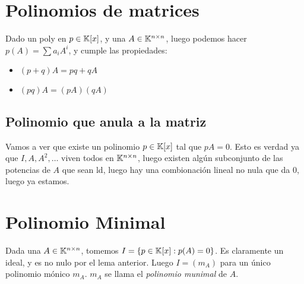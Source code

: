 \documentclass{article}
\begin{document}
\section*{Polinomios de matrices}
Dado un poly en $p \in \mathbb{K}[x]$, y una $A\in \mathbb{K}^{n \times n}$, luego podemos hacer $p(A) = \sum a_iA^i$, y cumple las propiedades:
\begin{itemize}
	\item $(p+q)A = pq + qA$
	\item $(pq)A = (pA)(qA)$
\end{itemize}

\subsection*{Polinomio que anula a la matriz}
Vamos a ver que existe un polinomio $p \in \mathbb{K}[x]$ tal que $pA = 0$. Esto es verdad ya que $I, A, A^2, \dots$ viven todos en $\mathbb{K}^{n \times n}$, luego existen algún subconjunto de las potencias de $A$ que sean ld, luego hay una combionación lineal no nula que da $0$, luego ya estamos.

\section*{Polinomio Minimal}
Dada una $A \in \mathbb{K}^{n \times n}$, tomemos $I = \{p \in \mathbb{K}[x] : p(A) = 0\}$. Es claramente un ideal, y es no nulo por el lema anterior. Luego $I = (m_A)$ para un único polinomio mónico $m_A$. $m_A$ se llama el \emph{polinomio munimal} de $A$.
\end{document}
